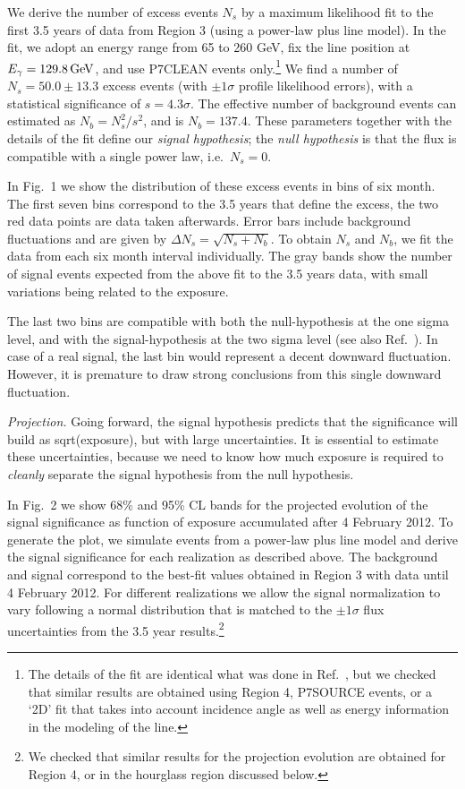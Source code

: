 \documentclass[aps,prd,superscriptaddress,showpacs,nofootinbib,fixlfloat, 12pt]{revtex4-1}
\begin{document}
We derive the number of excess events $N_s$ by a maximum likelihood fit to the
first 3.5 years of data from Region 3 (using a power-law plus line model). In
the fit, we adopt an energy range from 65 to 260 GeV, fix the line position at
$E_\gamma=129.8\rm\,GeV$, and use P7CLEAN events only.\footnote{The details of
the fit are identical what was done in Ref.~\cite{Weniger:2012}, but we
checked that similar results are obtained using Region 4, P7SOURCE events,
or a `2D' fit that takes into account incidence angle as well as energy
information in the modeling of the line.} We find a number of $N_s=50.0\pm 13.3$
excess events (with $\pm1\sigma$ profile likelihood errors), with a
statistical significance of $s=4.3\sigma$. The effective number
of background events can estimated as $N_b = N_s^2/s^2$, and is $N_b=137.4$.
These parameters together with the details of the fit define our \emph{signal
hypothesis}; the \emph{null hypothesis} is that the flux is compatible with a
single power law, i.e.~$N_s=0$.

In Fig.~1 we show the distribution of these excess events in bins of six
month. The first seven bins correspond to the 3.5 years that define the
excess, the two red data points are data taken afterwards. Error bars include
background fluctuations and are given by $\Delta N_s = \sqrt{N_s+N_b}$. To
obtain $N_s$ and $N_b$, we fit the data from each six month interval
individually. The gray bands show the number of signal events expected from
the above fit to the 3.5 years data, with small variations being related to
the exposure.

The last two bins are compatible with both the null-hypothesis at the one
sigma level, and with the signal-hypothesis at the two sigma level (see also
Ref.~\cite{Weniger:2013dya}). In case of a real signal, the last bin would
represent a decent downward fluctuation. However, it is premature to
draw strong conclusions from this single downward fluctuation.

\emph{Projection.} 
Going forward, the signal hypothesis predicts that the significance will build
as sqrt(exposure), but with large uncertainties.  It is essential to estimate
these uncertainties, because we need to know how much exposure is required to
\emph{cleanly} separate the signal hypothesis from the null hypothesis. 

In Fig.~2 we show 68\% and 95\% CL bands for the projected evolution of the
signal significance as function of exposure accumulated after 4 February 2012.
To generate the plot, we simulate events from a power-law plus line model and
derive the signal significance for each realization as described above. The
background and signal correspond to the best-fit values obtained in Region 3
with data until 4 February 2012.  For different realizations we allow the
signal normalization to vary following a normal distribution that is matched
to the $\pm1\sigma$ flux uncertainties from the 3.5 year results.\footnote{We
checked that similar results for the projection evolution are obtained for
Region 4, or in the hourglass region discussed below.}
\end{document}
